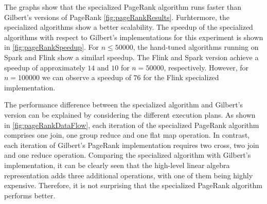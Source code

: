 The graphs show that the specialized PageRank algorithm runs faster than Gilbert's versions of PageRank \cref{fig:pageRankResults}.
Furhtermore, the specialized algorithms show a better scalability.
The speedup of the specialized algorithms with respect to Gilbert's implementations for this experiment is shown in \cref{fig:pageRankSpeedup}.
For $n\le 50000$, the hand-tuned algorithms running on Spark and Flink show a similarl speedup.
The Flink and Spark version achieve a speedup of approximately $14$ and $10$ for $n=50000$, respectively.
However, for $n = 100000$ we can observe a speedup of $76$ for the Flink specialized implementation.

The performance difference between the specialized algorithm and Gilbert's version can be explained by considering the different execution plans.
As shown in \cref{fig:pageRankDataFlow}, each iteration of the specialized PageRank algorithm comprises one join, one group reduce and one flat map operation.
In contrast, each iteration of Gilbert's PageRank implementation requires two cross, two join and one reduce operation.
Comparing the specialized algorithm with Gilbert's implementation, it can be clearly seen that the high-level linear algebra representation adds three additional operations, with one of them being highly expensive.
Therefore, it is not surprising that the specialized PageRank algorithm performs better.

